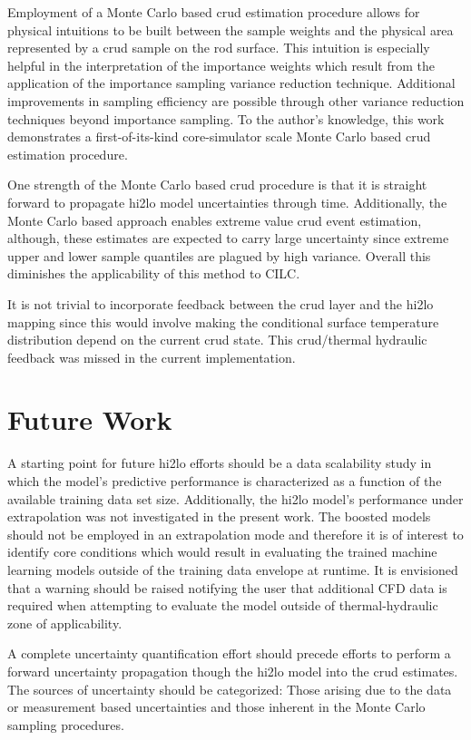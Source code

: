 Employment of a Monte Carlo based crud estimation procedure allows for physical intuitions to be built between the sample weights and the physical area represented by a crud sample on the rod surface.  This intuition is especially helpful in the interpretation of the importance weights which result from the application of the importance sampling variance reduction technique.  Additional improvements in sampling efficiency are possible through other variance reduction techniques beyond importance sampling.  To the author's knowledge, this work demonstrates a first-of-its-kind core-simulator scale Monte Carlo based crud estimation procedure.

One strength of the Monte Carlo based crud procedure is that it is straight forward to propagate hi2lo model uncertainties through time.  Additionally, the Monte Carlo based approach enables extreme value crud event estimation, although, these estimates are expected to carry large uncertainty since extreme upper and lower sample quantiles are plagued by high variance.  Overall this diminishes the applicability of this method to CILC.

It is not trivial to incorporate feedback between the crud layer and the hi2lo mapping since this would involve making the conditional surface temperature distribution depend on the current crud state.  This crud/thermal hydraulic feedback was missed in the current implementation.


\section{Future Work}

A starting point for future hi2lo efforts should be a data scalability study in which the model's predictive performance is characterized as a function of the available training data set size.  Additionally,
the hi2lo model's performance under extrapolation was not investigated in the present work.  The boosted models should not be employed in an extrapolation mode and therefore it is of interest to identify core conditions which would result in evaluating the trained machine learning models outside of the training data envelope at runtime.  It is envisioned that a warning should be raised notifying the user that additional CFD data is required when attempting to evaluate the model outside of thermal-hydraulic zone of applicability.

A complete uncertainty quantification effort should precede efforts to perform a forward uncertainty propagation though the hi2lo model into the crud estimates.  The sources of uncertainty should be categorized: Those arising due to the data or measurement based uncertainties and those inherent in the Monte Carlo sampling procedures.

